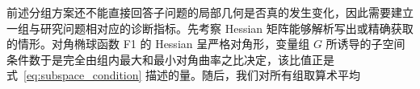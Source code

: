 前述分组方案还不能直接回答子问题的局部几何是否真的发生变化，因此需要建立一组与研究问题相对应的诊断指标。先考察 Hessian 矩阵能够解析写出或精确获取的情形。对角椭球函数 F1 的 Hessian 呈严格对角形，变量组 $G$ 所诱导的子空间条件数于是完全由组内最大和最小对角曲率之比决定，该比值正是式~\eqref{eq:subspace_condition} 描述的量。随后，我们对所有组取算术平均